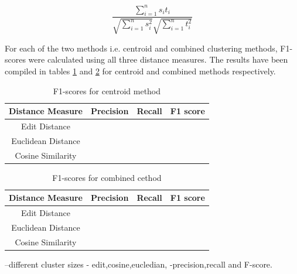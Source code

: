 \documentclass[conference]{IEEEtran}
\begin{document}
\begin{equation}
\frac{\sum_{i=1}^n{s_it_i}}{\sqrt{\sum_{i=1}^ns_i^2}\sqrt{\sum_{i=1}^nt_i^2}}
\end{equation}

For each of the two methods i.e. centroid and combined clustering methods, F1-scores were calculated using all three distance measures. The results have been compiled in tables \ref{results1} and \ref{results2} for centroid and combined methods respectively.

\begin{table}[h]
\centering
\caption{F1-scores for centroid method}
\begin{tabular}{|c|c|c|c|}
\hline
Distance Measure & Precision & Recall & F1 score\\
\hline \hline
Edit Distance & & &\\
Euclidean Distance & & & \\
Cosine Similarity & & &\\
\hline
\end{tabular}
\label{results1}
\end{table}


\begin{table}[h]
\centering
\caption{F1-scores for combined cethod}
\begin{tabular}{|c|c|c|c|}
\hline
Distance Measure & Precision & Recall & F1 score\\
\hline\hline
Edit Distance & & &\\
Euclidean Distance & & &\\
Cosine Similarity & & &\\
\hline
\end{tabular}
\label{results2}
\end{table}

 --different cluster sizes - edit,cosine,eucledian, -precision,recall and F-score.
\end{document}
